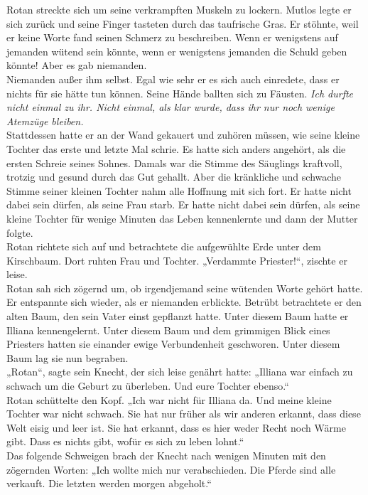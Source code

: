 Rotan streckte sich um seine verkrampften Muskeln zu lockern. Mutlos legte er sich zurück und seine 
Finger tasteten durch das taufrische Gras. Er stöhnte, weil er keine Worte fand seinen Schmerz zu 
beschreiben. Wenn er wenigstens auf jemanden wütend sein könnte, wenn er wenigstens jemanden die 
Schuld geben könnte! Aber es gab niemanden.\\
Niemanden außer ihm selbst. Egal wie sehr er es sich auch einredete, dass er nichts für sie hätte 
tun können. Seine Hände ballten sich zu Fäusten. \textit{Ich durfte nicht einmal zu ihr. Nicht 
einmal, als klar wurde, dass ihr nur noch wenige Atemzüge bleiben.}\\
Stattdessen hatte er an der Wand gekauert und zuhören müssen, wie seine kleine Tochter das erste 
und 
letzte Mal schrie. Es hatte sich anders angehört, als die ersten Schreie seines Sohnes. Damals war 
die Stimme des Säuglings kraftvoll, trotzig und gesund durch das Gut gehallt. Aber die kränkliche 
und schwache Stimme seiner kleinen Tochter nahm alle Hoffnung mit sich fort. Er hatte nicht dabei 
sein dürfen, als seine Frau starb. Er hatte nicht dabei sein dürfen, als seine kleine Tochter für 
wenige Minuten das Leben kennenlernte und dann der Mutter folgte.\\
Rotan richtete sich auf und betrachtete die aufgewühlte Erde unter dem Kirschbaum. Dort ruhten Frau 
und Tochter. „Verdammte Priester!“, zischte er leise.\\
Rotan sah sich zögernd um, ob irgendjemand seine wütenden Worte gehört hatte. Er entspannte sich 
wieder, als er niemanden erblickte. Betrübt betrachtete er den alten Baum, den sein Vater einst 
gepflanzt hatte. Unter diesem Baum hatte er Illiana kennengelernt. Unter diesem Baum und dem 
grimmigen Blick eines Priesters hatten sie einander ewige Verbundenheit geschworen. Unter diesem 
Baum lag sie nun begraben.\\
„Rotan“, sagte sein Knecht, der sich leise genährt hatte: „Illiana war einfach zu schwach um die 
Geburt zu überleben. Und eure Tochter ebenso.“\\
Rotan schüttelte den Kopf. „Ich war nicht für Illiana da. Und meine kleine Tochter war nicht 
schwach. Sie hat nur früher als wir anderen erkannt, dass diese Welt eisig und leer ist. Sie hat 
erkannt, dass es hier weder Recht noch Wärme gibt. Dass es nichts gibt, wofür es sich zu leben 
lohnt.“\\
Das folgende Schweigen brach der Knecht nach wenigen Minuten mit den zögernden Worten: „Ich wollte 
mich nur verabschieden. Die Pferde sind alle verkauft. Die letzten werden morgen abgeholt.“\\
